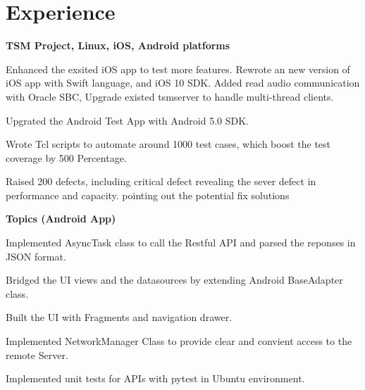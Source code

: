 \documentclass[a4paper]{lyu-resume} %
\begin{document}
\begin{minipage}[t]{0.66\textwidth} %


\section{Experience}


\textbf{TSM Project, Linux, iOS, Android platforms}
\vspace{\topsep} %
\begin{tightitemize}
\item Enhanced the exsited iOS app to test more features. Rewrote an new version of iOS app with Swift language, and iOS 10 SDK. Added read audio communication with Oracle SBC, Upgrade existed tsmserver to handle multi-thread clients.
\item Upgrated the Android Test App with Android 5.0 SDK.
\item Wrote Tcl scripts to automate around 1000 test cases, which boost the test coverage by 500 Percentage. 
\item Raised 200 defects, including critical defect revealing the sever defect in performance and capacity. pointing out the potential fix solutions
\end{tightitemize}

\sectionspace %



\textbf{Topics (Android App)}
\begin{tightitemize}
\item Implemented AsyncTask class to call the Restful API and parsed the reponses in JSON format.
\item Bridged the UI views and the datasources by extending Android BaseAdapter class.
\item Built the UI with Fragments and navigation drawer.
\item Implemented NetworkManager Class to provide clear and convient access to the remote Server.
\item Implemented unit tests for APIs with pytest in Ubuntu environment. 
\end{tightitemize}


\end{minipage}
\end{document}
